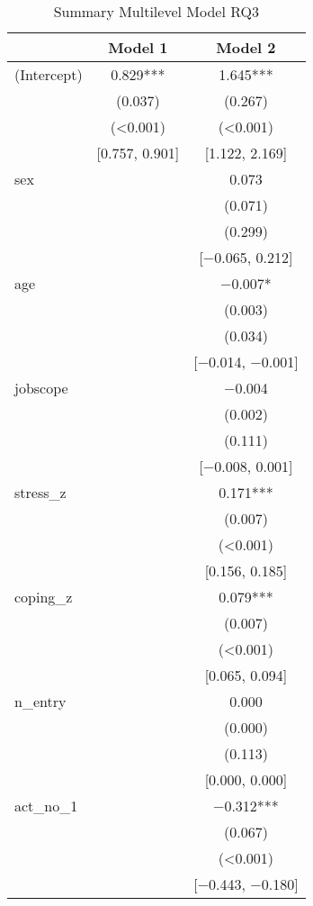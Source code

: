 \documentclass[
]{article}
\begin{document}
\begin{table}[H]
\centering\centering
\caption{\label{tab:rq3 results table}Summary Multilevel Model RQ3}
\centering
\begin{tabular}[t]{lcc}
\toprule
  & Model 1 & Model 2\\
\midrule
(Intercept) & \num{0.829}*** & \num{1.645}***\\
 & (\num{0.037}) & (\num{0.267})\\
 & (\num{<0.001}) & (\num{<0.001})\\
 & {}[\num{0.757}, \num{0.901}] & {}[\num{1.122}, \num{2.169}]\\
sex &  & \num{0.073}\\
 &  & \vphantom{2} (\num{0.071})\\
 &  & (\num{0.299})\\
 &  & {}[\num{-0.065}, \num{0.212}]\\
age &  & \num{-0.007}*\\
 &  & \vphantom{1} (\num{0.003})\\
 &  & (\num{0.034})\\
 &  & {}[\num{-0.014}, \num{-0.001}]\\
jobscope &  & \num{-0.004}\\
 &  & \vphantom{1} (\num{0.002})\\
 &  & (\num{0.111})\\
 &  & {}[\num{-0.008}, \num{0.001}]\\
stress\_z &  & \num{0.171}***\\
 &  & \vphantom{1} (\num{0.007})\\
 &  & \vphantom{18} (\num{<0.001})\\
 &  & {}[\num{0.156}, \num{0.185}]\\
coping\_z &  & \num{0.079}***\\
 &  & (\num{0.007})\\
 &  & \vphantom{17} (\num{<0.001})\\
 &  & {}[\num{0.065}, \num{0.094}]\\
n\_entry &  & \num{0.000}\\
 &  & (\num{0.000})\\
 &  & (\num{0.113})\\
 &  & {}[\num{0.000}, \num{0.000}]\\
act\_no\_1 &  & \num{-0.312}***\\
 &  & \vphantom{1} (\num{0.067})\\
 &  & \vphantom{16} (\num{<0.001})\\
 &  & {}[\num{-0.443}, \num{-0.180}]\\

\end{tabular}
\end{table}
\end{document}
